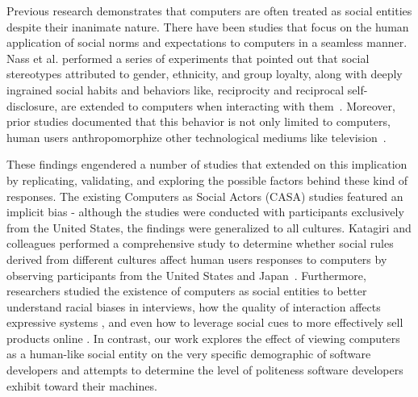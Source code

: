 \documentclass{sig-alternate-05-2015}
\begin{document}
Previous research demonstrates that computers are often treated as social entities despite their inanimate nature. There have been studies that focus on the human application of social norms and expectations to computers in a seamless manner. Nass et al. performed a series of experiments that pointed out that social stereotypes attributed to gender, ethnicity, and group loyalty, along with deeply ingrained social habits and behaviors like, reciprocity and reciprocal self-disclosure, are extended to computers when interacting with them~\cite{Nass2000machines,nass1999people}. Moreover, prior studies documented that this behavior is not only limited to computers, human users anthropomorphize other technological mediums like television~\cite{reeves1996people}.

\hfill

These findings engendered a number of studies that extended on this implication by replicating, validating, and exploring the possible factors behind these kind of responses. The existing Computers as Social Actors (CASA) studies featured an implicit bias - although the studies were conducted with participants exclusively from the United States, the findings were generalized to all cultures. Katagiri and colleagues performed a comprehensive study to determine whether social rules derived from different cultures affect human users responses to computers by observing participants from the United States and Japan~\cite{katagiri2001cross}. Furthermore, researchers studied the existence of computers as social entities to better understand racial biases in interviews\cite{krysan2003race}, how the quality of interaction affects expressive systems \cite{vidyarthi2011sympathetic}, and even how to leverage social cues to more effectively sell products online \cite{wang2007can}. In contrast, our work explores the effect of viewing computers as a human-like social entity on the very specific demographic of software developers and attempts to determine the level of politeness software developers exhibit toward their machines.

\hfill
\end{document}
